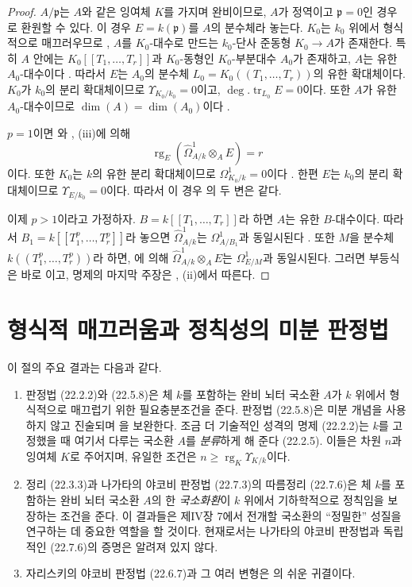 \begin{proof}
$A/\mathfrak p$는 $A$와 같은 잉여체 $K$를 가지며 완비이므로, $A$가
정역이고 $\mathfrak p=0$인 경우로 환원할 수 있다. 이 경우
$E=k(\mathfrak p)$를 $A$의 분수체라 놓는다. $K_0$는 $k_0$ 위에서
형식적으로 매끄러우므로 , $A$를 $K_0$-대수로
만드는 $k_0$-단사 준동형 $K_0\to A$가 존재한다. 특히 $A$ 안에는
$K_0[[T_1,\ldots,T_r]]$과 $K_0$-동형인 $K_0$-부분대수 $A_0$가
존재하고, $A$는 유한 $A_0$-대수이다 . 따라서
$E$는 $A_0$의 분수체 $L_0=K_0((T_1,\ldots,T_r))$의 유한 확대체이다.
$K_0$가 $k_0$의 분리 확대체이므로 $\Upsilon_{K_0/k_0}=0$이고,
$\deg.\operatorname{tr}_{L_0}E=0$이다. 또한 $A$가 유한
$A_0$-대수이므로 $\dim(A)=\dim(A_0)$이다 .

$p=1$이면 와 , (iii)에 의해
\[
  \operatorname{rg}_E(\widehat\Omega^1_{A/k}\otimes_AE)=r
\]
이다. 또한 $K_0$는 $k$의 유한 분리 확대체이므로
$\Omega^1_{K_0/k}=0$이다 . 한편 $E$는 $k_0$의
분리 확대체이므로 $\Upsilon_{E/k_0}=0$이다. 따라서 이 경우
의 두 변은 같다.

이제 $p>1$이라고 가정하자. $B=k[[T_1,\ldots,T_r]]$라 하면 $A$는
유한 $B$-대수이다. 따라서 $B_1=k[[T_1^p,\ldots,T_r^p]]$라 놓으면
$\widehat\Omega^1_{A/k}$는 $\Omega^1_{A/B_1}$과 동일시된다
. 또한 $M$을 분수체
$k((T_1^p,\ldots,T_r^p))$라 하면, 에 의해
$\widehat\Omega^1_{A/k}\otimes_AE$는 $\Omega^1_{E/M}$과 동일시된다.
그러면 부등식 은 바로
이고, 명제의 마지막 주장은
, (ii)에서 따른다.
\end{proof}

\section{형식적 매끄러움과 정칙성의 미분 판정법}
\label{section:0.22-ko}
\label{0.22-ko}

이 절의 주요 결과는 다음과 같다.
\begin{enumerate}
  \item[a)] 판정법 (22.2.2)와 (22.5.8)은 체 $k$를 포함하는 완비
  뇌터 국소환 $A$가 $k$ 위에서 형식적으로 매끄럽기 위한 필요충분조건을
  준다. 판정법 (22.5.8)은 미분 개념을 사용하지 않고 진술되며
  을 보완한다. 조금 더 기술적인 성격의 명제
  (22.2.2)는 $k$를 고정했을 때 여기서 다루는 국소환 $A$를
  \emph{분류}하게 해 준다 (22.2.5). 이들은 차원 $n$과 잉여체 $K$로
  주어지며, 유일한 조건은
  $n\geqslant\operatorname{rg}_K\Upsilon_{K/k}$이다.

  \item[b)] 정리 (22.3.3)과 나가타의 야코비 판정법 (22.7.3)의 따름정리
  (22.7.6)은 체 $k$를 포함하는 완비 뇌터 국소환 $A$의 한
  \emph{국소화환}이 $k$ 위에서 기하학적으로 정칙임을 보장하는 조건을
  준다. 이 결과들은 제IV장 \textsection7에서 전개할 국소환의
  ``정밀한'' 성질을 연구하는 데 중요한 역할을 할 것이다. 현재로서는
  나가타의 야코비 판정법과 독립적인 (22.7.6)의 증명은 알려져 있지 않다.

  \item[c)] 자리스키의 야코비 판정법 (22.6.7)과 그 여러 변형은
  의 쉬운 귀결이다.
\end{enumerate}

